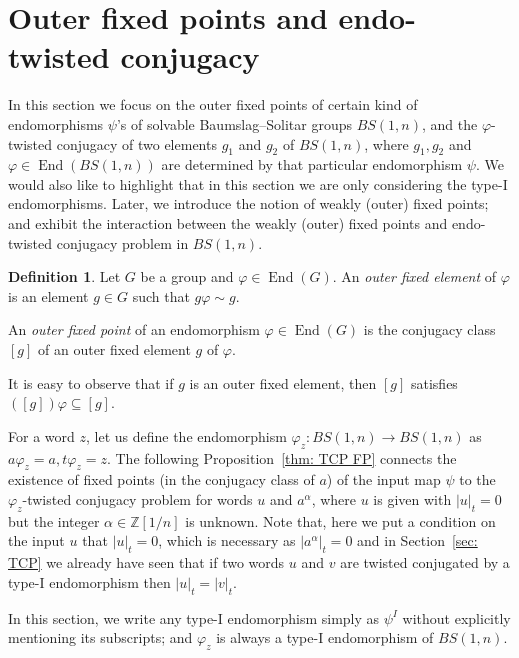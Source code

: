 \documentclass[a4paper]{amsart}
\theoremstyle{definition}
\newtheorem{dfn}[thm]{Definition}
\newcommand\ZZ{\mathbb{Z}}
\newcommand{\End}{\operatorname{End}}
\begin{document}
\section{Outer fixed points and endo-twisted conjugacy}\label{sec: outer fixed points}

In this section we focus on the outer fixed points of certain kind of endomorphisms $\psi$'s of solvable Baumslag--Solitar groups $BS(1, n)$, and the $\varphi$-twisted conjugacy of two elements $g_1$ and $g_2$ of $BS(1, n)$, where $g_1, g_2$ and $\varphi \in \End(BS(1,n))$ are determined by that particular endomorphism $\psi$. 
We would also like to highlight that in this section we are only considering the type-I endomorphisms. Later, we introduce the notion of weakly (outer) fixed points; and exhibit the interaction between the weakly (outer) fixed points and endo-twisted conjugacy problem in $BS(1, n)$.


\begin{dfn}
    Let $G$ be a group and $\varphi \in \End(G)$. An \emph{outer fixed element} of $\varphi$ is an element $g \in G$ such that $g \varphi \sim g$. 

    An \emph{outer fixed point} of an endomorphism $\varphi \in \End(G)$ is the conjugacy class $[g]$ of an outer fixed element $g$ of $\varphi$. 
\end{dfn}

It is easy to observe that if $g$ is an outer fixed element, then $[g]$ satisfies $([g])\varphi \subseteq [g]$.

For a word $z$, let us define the endomorphism $\varphi_z : BS(1, n) \rightarrow BS(1, n)$ as
$a\varphi_z = a, t\varphi_z = z$. The following Proposition~\ref {thm: TCP FP} connects the existence of fixed points (in the conjugacy class of $a$) of the input map $\psi$ to the $\varphi_z$-twisted conjugacy problem for words $u$ and $a^\alpha$, where $u$ is given with $|u|_t = 0$ but the integer $\alpha \in \ZZ[1/n]$ is unknown. Note that, here we put a condition on the input $u$ that $|u|_t = 0$, which is necessary as $|a^\alpha|_t = 0$ and in Section~\ref{sec: TCP} we already have seen that if two words $u$ and $v$ are twisted conjugated by a type-I endomorphism then $|u|_t = |v|_t$.

In this section, we write any type-I endomorphism simply as $\psi^{I}$ without explicitly mentioning its subscripts; and $\varphi_z$ is always a type-I endomorphism of $BS(1,n)$.
\end{document}
